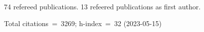 74 refereed publications. 13 refeered publications as first author.

Total citations~=~3269; h-index~=~32 (2023-05-15)